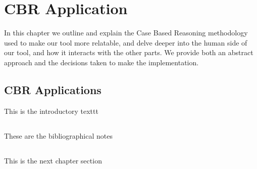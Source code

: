 %
%

\chapter{CBR Application}

\begin{resumen}
In this chapter we outline and explain the Case Based Reasoning methodology used to make our tool more relatable, and delve deeper into the human side of our tool, and how it interacts with the other parts.
We provide both an abstract approach and the decisions taken to make the implementation.
\end{resumen}


\section{CBR Applications}
\label{cap1:sec:introduccion}

This is the introductory texttt

\section*{\NotasBibliograficas}
\TocNotasBibliograficas

These are the bibliographical notes
\citep{ldesc2e}

\medskip



\section*{\ProximoCapitulo}
\TocProximoCapitulo

This is the next chapter section

